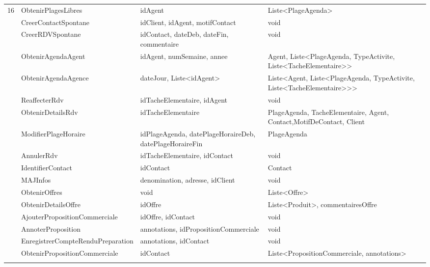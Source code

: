 \begin{table}[H]
{\begin{tabular}{P{0.8cm}P{5.5cm}P{6cm}P{6cm}}
			16 & ObtenirPlagesLibres & idAgent &  Liste<PlageAgenda> \\  & CreerContactSpontane & idClient, idAgent, motifContact &  void \\  & CreerRDVSpontane & idContact, dateDeb, dateFin, commentaire &  void \\  & ObtenirAgendaAgent & idAgent, numSemaine, annee &  Agent, Liste<PlageAgenda, TypeActivite, Liste<TacheElementaire>> \\  & ObtenirAgendaAgence & dateJour, Liste<idAgent> &  Liste<Agent, Liste<PlageAgenda, TypeActivite, Liste<TacheElementaire>>> \\  & ReaffecterRdv & idTacheElementaire, idAgent &  void \\  & ObtenirDetailsRdv & idTacheElementaire &  PlageAgenda, TacheElementaire, Agent, Contact,MotifDeContact, Client \\  & ModifierPlageHoraire & idPlageAgenda, datePlageHoraireDeb, datePlageHoraireFin &  PlageAgenda \\  & AnnulerRdv & idTacheElementaire, idContact &  void \\  & IdentifierContact & idContact &  Contact \\  & MAJInfos & denomination, adresse, idClient &  void \\  & ObtenirOffres & void &  Liste<Offre> \\  & ObtenirDetailsOffre & idOffre &  Liste<Produit>, commentairesOffre \\  & AjouterPropositionCommerciale & idOffre, idContact &  void \\  & AnnoterProposition & annotations, idPropositionCommerciale &  void \\  & EnregistrerCompteRenduPreparation & annotations, idContact &  void \\  & ObtenirPropositionCommerciale & idContact &  Liste<PropositionCommerciale, annotations> \\ \hline

\end{tabular}}
\end{table}
